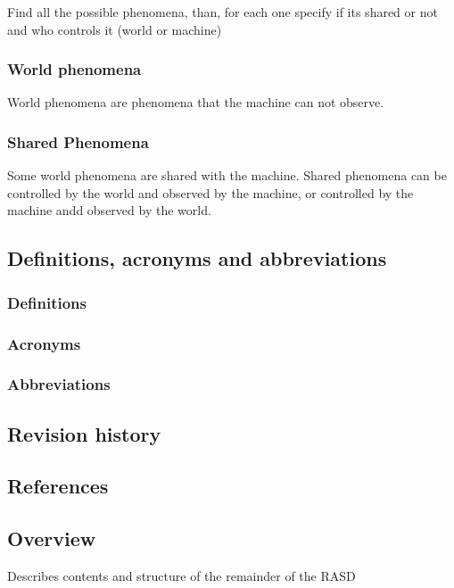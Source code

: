 Find all the possible phenomena, than, for each one specify if its shared or not and who controls it (world or machine)

\subsubsection{World phenomena}
\label{subsubsect:worldphenomena}

World phenomena are phenomena that the machine can not observe.

\subsubsection{Shared Phenomena}
\label{subsubsect:sharedphenomena}

Some world phenomena are shared with the machine.
Shared phenomena can be controlled by the world and observed by the machine, or controlled by the machine andd observed by the world.

\subsection{Definitions, acronyms and abbreviations}
\label{subsect:definitionsacronymsabbreviations}

\subsubsection{Definitions}
\label{subsect:definitions}

\subsubsection{Acronyms}
\label{subsect:acronyms}

\subsubsection{Abbreviations}
\label{subsect:abbreviations}

\subsection{Revision history}
\label{subsect:revisionhistory}

\subsection{References}
\label{subsect:references}

\subsection{Overview}
\label{subsect:overview}

Describes contents and structure of the remainder of the RASD